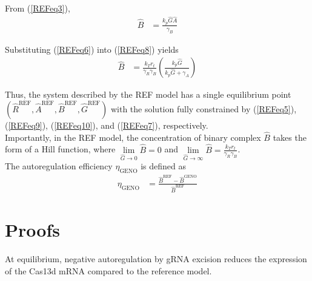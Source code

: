 \documentclass[12pt]{article}
\numberwithin{equation}{section}
\newenvironment{theorem}[2][Theorem]{\begin{trivlist}
\item[\hskip \labelsep {\bfseries #1}\hskip \labelsep {\bfseries #2.}]}{\end{trivlist}}
\begin{document}
\noindent From (\ref{REFeq3}),
\begin{align}
  \hat{B} &= \frac{k_p \hat{G} \hat{A}}{\gamma_B} \label{REFeq8}
\end{align}

\noindent Substituting (\ref{REFeq6}) into (\ref{REFeq8}) yields
\begin{align}
  \hat{B} &= \frac{k_T r_t}{\gamma_R \gamma_B} \left( \frac{k_p \hat{G}}{k_p \hat{G} + \gamma_A} \right) \label{REFeq10}
\end{align}

\noindent Thus, the system described by the REF model has a single equilibrium point\\ $(\hat{R}^{\mathrm{REF}}, \hat{A}^{\mathrm{REF}}, \hat{B}^{\mathrm{REF}}, \hat{G}^{\mathrm{REF}})$ with the solution fully constrained by (\ref{REFeq5}), (\ref{REFeq9}), (\ref{REFeq10}), and (\ref{REFeq7}), respectively. \\

\noindent Importantly, in the REF model, the concentration of binary complex $\hat{B}$ takes the form of a Hill function, where $\lim\limits_{\hat{G} \to 0} \hat{B} = 0$ and $\lim\limits_{\hat{G} \to \infty} \hat{B} = \frac{k_T r_t}{\gamma_R \gamma_B}$. \\

\noindent The autoregulation efficiency $\eta_{\mathrm{GENO}}$ is defined as
\begin{align}
  \eta_{\mathrm{GENO}} &= \frac{\hat{B}^{\mathrm{REF}} - \hat{B}^{\mathrm{GENO}}}{\hat{B}^{\mathrm{REF}}}
\end{align}

\section{Proofs}

\begin{theorem}{1}
  At equilibrium, negative autoregulation by gRNA excision reduces the expression of the Cas13d mRNA compared to the reference model.
\end{theorem}
\end{document}
